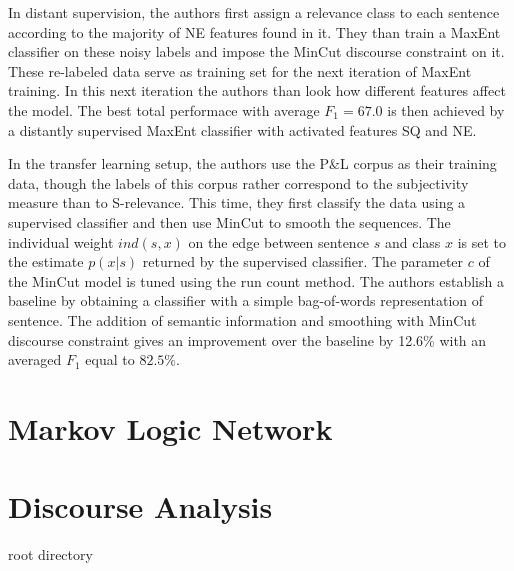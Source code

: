 \documentclass[a4paper,11pt]{article}
\begin{document}
In distant supervision, the authors first assign a relevance class to
each sentence according to the majority of NE features found in it.
They than train a MaxEnt classifier on these noisy labels and impose
the MinCut discourse constraint on it.  These re-labeled data serve as
training set for the next iteration of MaxEnt training.  In this next
iteration the authors than look how different features affect the
model.  The best total performace with average $F_1 = 67.0$ is then
achieved by a distantly supervised MaxEnt classifier with activated
features SQ and NE.

In the transfer learning setup, the authors use the P\&L corpus as
their training data, though the labels of this corpus rather
correspond to the subjectivity measure than to S-relevance.  This
time, they first classify the data using a supervised classifier and
then use MinCut to smooth the sequences.  The individual weight
$ind(s,x)$ on the edge between sentence $s$ and class $x$ is set to
the estimate $p(x|s)$ returned by the supervised classifier.  The
parameter $c$ of the MinCut model is tuned using the run count method.
The authors establish a baseline by obtaining a classifier with a
simple bag-of-words representation of sentence.  The addition of
semantic information and smoothing with MinCut discourse constraint
gives an improvement over the baseline by 12.6\% with an averaged
$F_1$ equal to $82.5\%$.

\section{Markov Logic Network}

\section{Discourse Analysis}

\nocite{*}  %
root directory 
\end{document}

